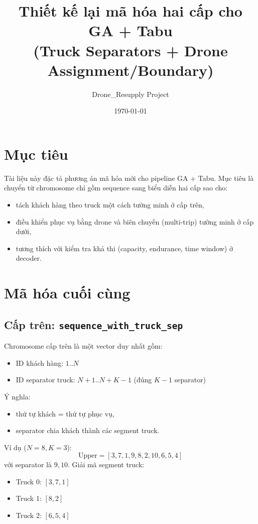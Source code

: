 \documentclass[12pt,a4paper]{article}
\title{Thiết kế lại mã hóa hai cấp cho GA + Tabu\\
(Truck Separators + Drone Assignment/Boundary)}
\author{Drone\_Resupply Project}
\date{\today}
\begin{document}
\maketitle

\section{Mục tiêu}
Tài liệu này đặc tả phương án mã hóa mới cho pipeline GA + Tabu.
Mục tiêu là chuyển từ chromosome chỉ gồm sequence sang biểu diễn hai cấp sao cho:
\begin{itemize}[leftmargin=1.2cm]
    \item tách khách hàng theo truck một cách tường minh ở cấp trên,
    \item điều khiển phục vụ bằng drone và biên chuyến (multi-trip) tường minh ở cấp dưới,
    \item tương thích với kiểm tra khả thi (capacity, endurance, time window) ở decoder.
\end{itemize}

\section{Mã hóa cuối cùng}
\subsection{Cấp trên: \texttt{sequence\_with\_truck\_sep}}
Chromosome cấp trên là một vector duy nhất gồm:
\begin{itemize}[leftmargin=1.2cm]
    \item ID khách hàng: $1..N$
    \item ID separator truck: $N+1..N+K-1$ (đúng $K-1$ separator)
\end{itemize}

Ý nghĩa:
\begin{itemize}[leftmargin=1.2cm]
    \item thứ tự khách = thứ tự phục vụ,
    \item separator chia khách thành các segment truck.
\end{itemize}

Ví dụ ($N=8, K=3$):
\[
\text{Upper}=[3,7,1,9,8,2,10,6,5,4]
\]
với separator là $9,10$.
Giải mã segment truck:
\begin{itemize}[leftmargin=1.2cm]
    \item Truck 0: $[3,7,1]$
    \item Truck 1: $[8,2]$
    \item Truck 2: $[6,5,4]$
\end{itemize}
\end{document}
